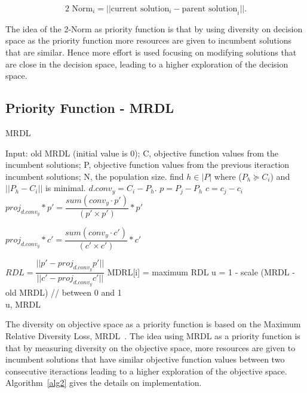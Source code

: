 \begin{equation}
 \text{2 Norm}_i = ||\text{current solution}_i - \text{parent solution}_i||.
\end{equation}

The idea of the 2-Norm as priority function is that by using diversity on decision space as the priority function more resources are given to incumbent solutions that are similar. Hence more effort is used focusing on modifying solutions that are close in the decision space, leading to a higher exploration of the decision space.


\subsection{Priority Function - MRDL} 


\begin{algorithm}[t]
	\caption{MRDL}\label{alg2}
	\begin{algorithmic}[1]
		
		\State Input: old MRDL (initial value is 0); C, objective function values from the incumbent solutions; P, objective function values from the previous iteraction incumbent solutions; N, the population size.
		\State find $h \in |P|$ where  ($P_h \succeq C_i$) and $||P_h - C_i  ||$ is minimal.
		\State $d.conv_{y} = C_i - P_h$.
		\State $p = P_j - P_h$
		\State $c = c_j - c_i$
		\State $proj_{d.conv_{y}}*p \prime = \dfrac{sum(conv_{y} \cdot p \prime)}{(p \prime \times p \prime)}*p \prime$
		
		\State $ proj_{d.conv_{y}}*c \prime = \dfrac{sum(conv_{y} \cdot c \prime)}{(c \prime \times c \prime)}*c \prime$
		
		\State $RDL = \dfrac{ ||p \prime - proj_{d.conv_{y}}p \prime|| }{||c \prime - proj_{d.conv_{y}}c \prime||}            $
		\EndFor
		MDRL[i] = maximum RDL
		\EndFor
		\State u = 1 - scale (MRDL - old MRDL) // between 0 and 1\\
	\Return u, MRDL
	\end{algorithmic}
\end{algorithm}


The diversity on objective space as a priority function  is based on the Maximum Relative Diversity Loss, MRDL~\cite{gee2015online}.  The idea using MRDL as a priority function is that by measuring diversity on the objective space, more resources are given to incumbent solutions that have similar objective function values between two consecutive iteractions leading to a higher exploration of the objective space. Algorithm~\ref{alg2} gives the details on implementation.
 
